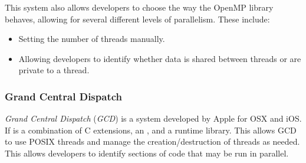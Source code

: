 This system also allows developers to choose the way the OpenMP library behaves, allowing for several different levels of parallelism.
These include:
\begin{itemize}[noitemsep]
\item Setting the number of threads manually.
\item Allowing developers to identify whether data is shared between threads or are private to a thread.
\end{itemize}

\subsubsection{Grand Central Dispatch}\label{subsubsec:Grand_Central_Dispatch}
\emph{Grand Central Dispatch} (\emph{GCD}) is a  system developed by Apple for OSX and iOS.\@
If is a combination of C extensions, an , and a runtime library.
This allows GCD to use POSIX threads and manage the creation/destruction of threads as needed.
This allows developers to identify sections of code that may be run in parallel.


